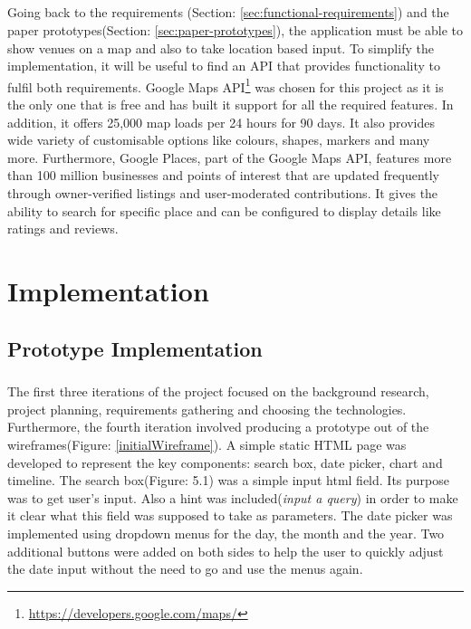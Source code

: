 \documentclass{l4proj}
\begin{document}
\paragraph{}
Going back to the requirements (Section: \ref{sec:functional-requirements}) and the paper prototypes(Section: \ref{sec:paper-prototypes}), the application must be able to show venues on a map and also to take location based input. To simplify the implementation, it will be useful to find an API that provides functionality to fulfil both requirements. Google Maps API\footnote{\url{https://developers.google.com/maps/}} was chosen for this project as it is the only one that is free and has built it support for all the required features. In addition, it offers 25,000 map loads per 24 hours for 90 days\cite{mapusage}. It also provides wide variety of customisable options like colours, shapes, markers and many more. Furthermore, Google Places\cite{mapplace}, part of the Google Maps API, features more than 100 million businesses and points of interest that are updated frequently through owner-verified listings and user-moderated contributions. It gives the ability to search for specific place and can be configured to display details like ratings and reviews.


\chapter{Implementation}

\section{Prototype Implementation}
\paragraph{}
The first three iterations of the project focused on the background research, project planning, requirements gathering and choosing the technologies. Furthermore, the fourth iteration involved producing a prototype out of the wireframes(Figure: \ref{initialWireframe}). A simple static HTML page was developed to represent the key components: search box, date picker, chart and timeline. The search box(Figure: 5.1) was a simple input html field. Its purpose was to get user's input. Also a hint was included(\textit{input a query}) in order to make it clear what this field was supposed to take as parameters. The date picker was implemented using dropdown menus for the day, the month and the year. Two additional buttons were added on both sides to help the user to quickly adjust the date input without the need to go and use the menus again.        
\end{document}
